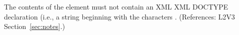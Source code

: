 The contents of the  element must not contain an XML XML
DOCTYPE declaration (i.e., a string beginning with the characters
.  (References: L2V3 Section~\ref{sec:notes}.)
